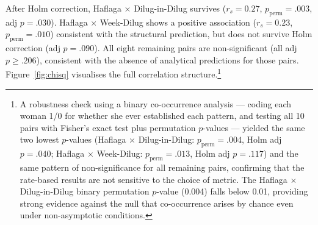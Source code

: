 \documentclass[12pt]{article}
\begin{document}
After Holm correction, Haflaga $\times$ Dilug-in-Dilug survives ($r_s = 0.27$,
$p_{\text{perm}} = .003$, adj $p = .030$). Haflaga $\times$ Week-Dilug shows a
positive association ($r_s = 0.23$, $p_{\text{perm}} = .010$) consistent with the
structural prediction, but does not survive Holm correction (adj $p = .090$). All
eight remaining pairs are non-significant (all adj $p \geq .206$), consistent with
the absence of analytical predictions for those pairs. Figure~\ref{fig:chisq} visualises the full correlation structure.\footnote{A
robustness check using a binary co-occurrence analysis --- coding each woman
1/0 for whether she ever established each pattern, and testing all 10 pairs with
Fisher's exact test plus permutation $p$-values --- yielded the same two lowest
$p$-values (Haflaga $\times$ Dilug-in-Dilug: $p_{\text{perm}} = .004$,
Holm adj $p = .040$; Haflaga $\times$ Week-Dilug: $p_{\text{perm}} = .013$,
Holm adj $p = .117$) and the same pattern of non-significance for all remaining
pairs, confirming that the rate-based results are not sensitive to the choice
of metric.
The Haflaga $\times$ Dilug-in-Dilug binary permutation $p$-value (0.004) falls below 0.01,
providing strong evidence against the null that co-occurrence arises by chance
even under non-asymptotic conditions.}
\end{document}

